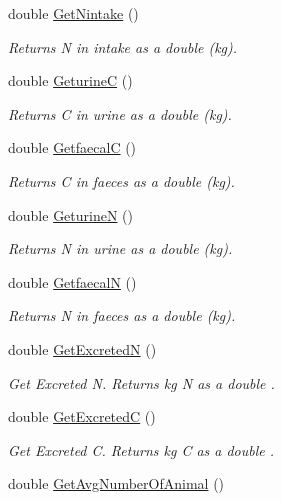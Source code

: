 \begin{DoxyCompactItemize}
double \mbox{\hyperlink{classlivestock_ae354b6d283542c620c13c26d56885ceb}{Get\+Nintake}} ()
\begin{DoxyCompactList}\small\item\em Returns N in intake as a double (kg). \end{DoxyCompactList}\item 
double \mbox{\hyperlink{classlivestock_a9f65c516bc1d05f80486bf8086fa6d57}{GeturineC}} ()
\begin{DoxyCompactList}\small\item\em Returns C in urine as a double (kg). \end{DoxyCompactList}\item 
double \mbox{\hyperlink{classlivestock_a91b8a5b2c1b40f6f010a8a3b8f67c5ed}{GetfaecalC}} ()
\begin{DoxyCompactList}\small\item\em Returns C in faeces as a double (kg). \end{DoxyCompactList}\item 
double \mbox{\hyperlink{classlivestock_a093a6fa94cb68cbc9c2c5f9ba9310a1c}{GeturineN}} ()
\begin{DoxyCompactList}\small\item\em Returns N in urine as a double (kg). \end{DoxyCompactList}\item 
double \mbox{\hyperlink{classlivestock_a181b286d51da38385a3528d3b27a9734}{GetfaecalN}} ()
\begin{DoxyCompactList}\small\item\em Returns N in faeces as a double (kg). \end{DoxyCompactList}\item 
double \mbox{\hyperlink{classlivestock_a311826e97a54c6df177b975b78d878f0}{Get\+ExcretedN}} ()
\begin{DoxyCompactList}\small\item\em Get Excreted N. Returns kg N as a double . \end{DoxyCompactList}\item 
double \mbox{\hyperlink{classlivestock_a1eda214a709c3097f8d471cc965d44fd}{Get\+ExcretedC}} ()
\begin{DoxyCompactList}\small\item\em Get Excreted C. Returns kg C as a double . \end{DoxyCompactList}\item 
double \mbox{\hyperlink{classlivestock_a00c96a37b8bbcceae2bbc6ecad03103a}{Get\+Avg\+Number\+Of\+Animal}} ()

\end{DoxyCompactItemize}
